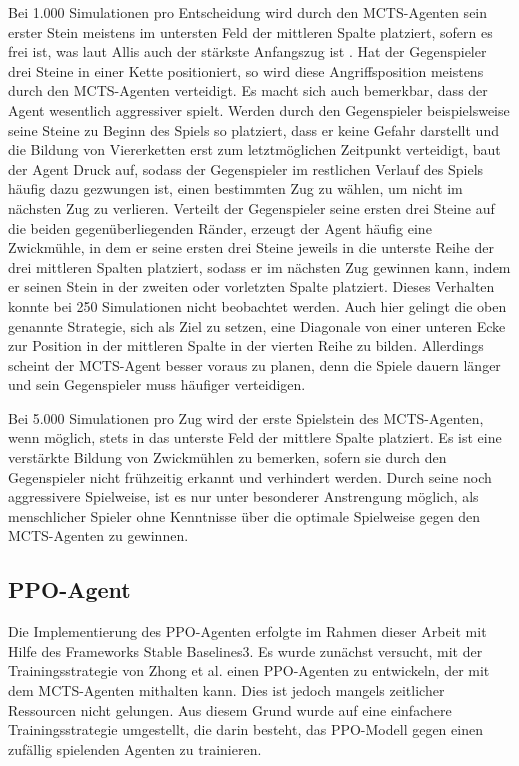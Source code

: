 Bei 1.000 Simulationen pro Entscheidung wird durch den MCTS-Agenten sein erster Stein meistens im untersten Feld der mittleren Spalte platziert, sofern es frei ist, was laut Allis auch der stärkste Anfangszug ist \cite{Allis.1988}. Hat der Gegenspieler drei Steine in einer Kette positioniert, so wird diese Angriffsposition meistens durch den MCTS-Agenten verteidigt. Es macht sich auch bemerkbar, dass der Agent wesentlich aggressiver spielt. Werden durch den Gegenspieler beispielsweise seine Steine zu Beginn des Spiels so platziert, dass er keine Gefahr darstellt und die Bildung von Viererketten erst zum letztmöglichen Zeitpunkt verteidigt, baut der Agent Druck auf, sodass der Gegenspieler im restlichen Verlauf des Spiels häufig dazu gezwungen ist, einen bestimmten Zug zu wählen, um nicht im nächsten Zug zu verlieren. Verteilt der Gegenspieler seine ersten drei Steine auf die beiden gegenüberliegenden Ränder, erzeugt der Agent häufig eine Zwickmühle, in dem er seine ersten drei Steine jeweils in die unterste Reihe der drei mittleren Spalten platziert, sodass er im nächsten Zug gewinnen kann, indem er seinen Stein in der zweiten oder vorletzten Spalte platziert. Dieses Verhalten konnte bei 250 Simulationen nicht beobachtet werden. Auch hier gelingt die oben genannte Strategie, sich als Ziel zu setzen, eine Diagonale von einer unteren Ecke zur Position in der mittleren Spalte in der vierten Reihe zu bilden. Allerdings scheint der MCTS-Agent besser voraus zu planen, denn die Spiele dauern länger und sein Gegenspieler muss häufiger verteidigen.

Bei 5.000 Simulationen pro Zug wird der erste Spielstein des MCTS-Agenten, wenn möglich, stets in das unterste Feld der mittlere Spalte platziert. Es ist eine verstärkte Bildung von Zwickmühlen zu bemerken, sofern sie durch den Gegenspieler nicht frühzeitig erkannt und verhindert werden. Durch seine noch aggressivere Spielweise, ist es nur unter besonderer Anstrengung möglich, als menschlicher Spieler ohne Kenntnisse über die optimale Spielweise gegen den MCTS-Agenten zu gewinnen.

\subsection{PPO-Agent}

Die Implementierung des PPO-Agenten erfolgte im Rahmen dieser Arbeit mit Hilfe des Frameworks Stable Baselines3. Es wurde zunächst versucht, mit der Trainingsstrategie von Zhong et al. einen PPO-Agenten zu entwickeln, der mit dem MCTS-Agenten mithalten kann. Dies ist jedoch mangels zeitlicher Ressourcen nicht gelungen. Aus diesem Grund wurde auf eine einfachere Trainingsstrategie umgestellt, die darin besteht, das PPO-Modell gegen einen zufällig spielenden Agenten zu trainieren.

